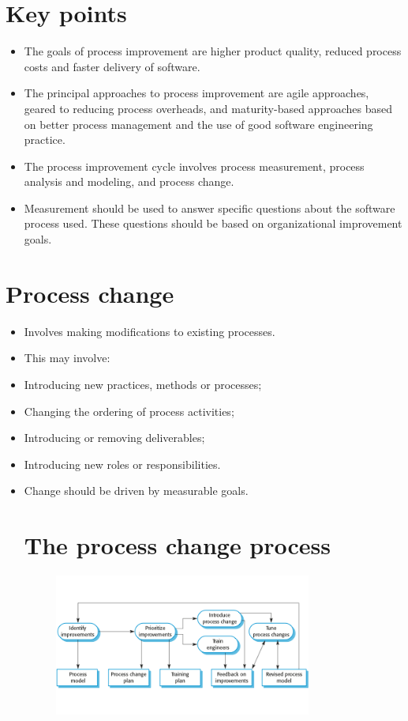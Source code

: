 \section{Key points}
\begin{itemize}


\item The goals of process improvement are higher product quality, reduced process costs and faster delivery of software.

\item The principal approaches to process improvement are agile approaches, geared to reducing process overheads, and maturity-based approaches based on better process management and the use of good software engineering practice.

\item The process improvement cycle involves process measurement, process analysis and modeling, and process change.

\item Measurement should be used to answer specific questions about the software process used. These questions should be based on organizational improvement goals.

\end{itemize}

\section{Process change}
\begin{itemize}

\item Involves making modifications to existing processes. \item This may involve:
   \item Introducing new practices, methods or processes;    \item Changing the ordering of process activities;    \item Introducing or removing deliverables;    \item Introducing new roles or responsibilities.
\item Change should be driven by measurable goals.
\section{The process change process}
\begin{figure}[h!]
    \centering
    \includegraphics[width = 0.8\textwidth]{./figures/L9_4.png}
    \caption{}
    \label{fig:L9_4}
\end{figure}


\end{itemize}

